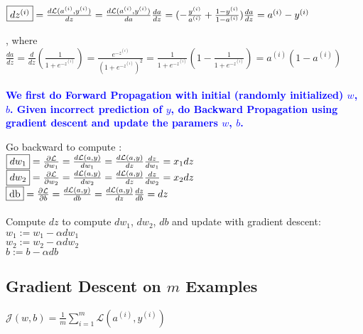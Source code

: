 \documentclass{article}
\begin{document}
$\fbox{$dz^{(i)}$} = \frac{d\mathcal{L}(a^{(i)},y^{(i)})}{dz} = \frac{d\mathcal{L}(a^{(i)},y^{(i)})}{da} \frac{da}{dz} = (-\frac{y^{(i)}}{a^{(i)}}+\frac{1-y^{(i)}}{1-a^{(i)}})\frac{da}{dz}= a^{(i)}-y^{(i)}$

, where $\frac{da}{dz} = \frac{d}{dz}(\frac{1}{1+e^{-z^{(i)}}}) = \frac{e^{-z^{(i)}}}{(1+e^{-z^{(i)}})^2} = \frac{1}{1+e^{-z^{(i)}}}(1-\frac{1}{1+e^{-z^{(i)}}})= a^{(i)}(1-a^{(i)})$\\\\

\textbf{\textcolor{blue}{We first do Forward Propagation with initial (randomly initialized) $w$, $b$. Given incorrect prediction of $y$, do Backward Propagation using gradient descent and update the paramers $w$, $b$.}}\\

\newpage

Go backward to compute :\\

$\fbox{$dw_1$} = \frac{\partial \mathcal{L}}{\partial w_1} =\frac{d\mathcal{L}(a,y)}{dw_1} =\frac{d\mathcal{L}(a,y)}{dz} \frac{dz}{dw_1}= x_1 dz$\\

$\fbox{$dw_2$} = \frac{\partial \mathcal{L}}{\partial w_2} =\frac{d\mathcal{L}(a,y)}{dw_2} =\frac{d\mathcal{L}(a,y)}{dz} \frac{dz}{dw_2}= x_2 dz$\\

$\fbox{db} = \frac{\partial \mathcal{L}}{\partial b} =\frac{d\mathcal{L}(a,y)}{db} =\frac{d\mathcal{L}(a,y)}{dz} \frac{dz}{db}= dz$\\\\

Compute $dz$ to compute $dw_1$, $dw_2$, $db$ and update with gradient descent:\\

$w_1 := w_1 - \alpha dw_1$\\

$w_2 := w_2 - \alpha dw_2$\\

$b := b - \alpha db $\\


\newpage
\subsection{Gradient Descent on $m$ Examples}

$\mathcal{J}(w,b) = \frac{1}{m}\sum_{i=1}^{m}\mathcal{L}(a^{(i)},y^{(i)})$\\
\end{document}
